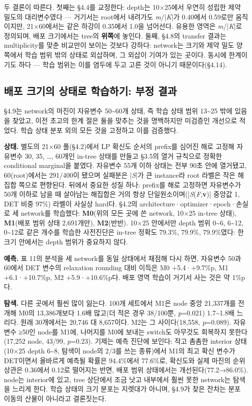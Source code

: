 \documentclass[final,5p,twocolumn]{elsarticle}
\begin{document}
두 결론이 따른다. 첫째는 §4.4를 교정한다: depth는 10×25에서 우연히 성립한 제약 밀도의 대리변수였다 — 거기서는 root에서 내려가도 \textit{m}/|\textit{K}|가 0.40에서 0.59로만 움직이지만, 21×60에서는 같은 하강이 0.35에서 1.0을 넘어선다. 유용한 영역은 \textit{m}/|\textit{K}|로 정의되며, 배포 크기에서는 tree의 \textbf{위쪽}에 놓인다. 둘째, §4.8의 transfer 결과는 multiplicity를 맞춘 비교만이 보이는 것보다 강하다: network는 크기와 제약 밀도 양쪽에서 학습 범위 밖의 상태로 외삽하며, 그 외삽이 기여가 있는 곳이다. 동시에 한계이기도 하다 — 학습 범위는 이를 염두에 두고 고른 것이 아니기 때문이다(§4.14).

\subsection{배포 크기의 상태로 학습하기: 부정 결과}
§4.9는 network의 마진이 자유변수 50\textasciitilde{}60개 상태, 즉 학습 상태 범위 13\textasciitilde{}25 밖에 있음을 찾았고, 이전 초고의 한계 절은 둘을 맞추는 것을 명백하지만 미검증인 개선으로 적었다. 학습 상태 분포 외의 모든 것을 고정하고 이를 검증했다.

\textbf{상태.} 별도의 21×60 풀(§4.2)에서 LP 확신도 순서의 prefix를 심어진 해로 고정해 자유변수 30, 35, …, 60개인 in-tree 상태를 만들고 §3.5의 열거 규칙으로 정확한 conditional marginal을 붙였다. 자유변수 55개 이하 상태는 전부 90초 안에 열거됐고, 60(root)에서는 291/400이 됐으며 실패분은 |\textit{S}|가 큰 instance라 root 라벨은 작은 해집합 쪽으로 편향된다. 뒤에서 중요한 성질 하나: prefix를 해로 고정하면 자유변수가 50개 이하로 남을 때 살아남는 해집합은 거의 항상 단일원소이며(|\textit{S}(\textit{F},\textbf{v})| 중앙값 1, DET 비중 97\%) 라벨이 사실상 hard다. §4.2의 architecture·optimizer·epoch·손실로 세 network를 학습했다: \textbf{M0}(위의 모든 곳에 쓴 network, 10×25 in-tree 상태), \textbf{M1}(배포 범위 상태 2,691개만), \textbf{M2}(반반). 10×25 안에서만 depth 범위 0\textasciitilde{}6, 6\textasciitilde{}12, 0\textasciitilde{}12로 같은 개수를 학습한 사전진단은 in-tree 정확도 79.3\%, 79.9\%, 79.9\%였다: 한 크기 안에서는 depth 범위가 중요하지 않다.

\textbf{예측.} 표 11의 분석을 세 network를 동일 상태에서 채점해 다시 하면, 자유변수 50과 60에서 DET 변수의 relaxation rounding 대비 이득은 M0 +5.4·+9.7\%p, M1 +6.1·+10.7\%p, M2 +5.9·+10.6\%p다. 배포 영역 학습이 거기서 사는 것은 약 1\%p다.

\textbf{탐색.} 다른 곳에서 훨씬 많이 잃는다. 100개 세트에서 M1은 node 중앙 21,337개를 전개해 M0의 13,386개보다 1.6배 많고(더 적은 경우 38/100뿐, \textit{p}=0.021) 1.7\textasciitilde{}1.8배 느리다. 원래 30개에서는 20,746 대 8,657이다. M2는 그 사이다(18,558, \textit{p}=0.089). 자유변수 ≥50인 node를 M1에, 나머지를 M0에 보내는 switch도 아무것도 회복하지 못한다(17,252 node, 43/99, \textit{p}=0.23). 기제는 예측 진단에 보인다: 작고 촘촘한 interior 상태(10×25 depth 6\textasciitilde{}8, 탐색이 node의 2/3를 쓰는 종류)에서 M1의 최고 확신 변수가 DET이면서 올바르게 예측될 확률은 94.4\%에서 77.6\%로, 확신도와 실제 마진의 순위 상관은 0.36에서 0.12로 떨어지는 반면, 배포 범위 상태에서는 개선된다(77.2→86.0\%). node는 interior에 있고, tree 상단에서 조금 낫고 내부에서 훨씬 못한 network는 탐색을 느리게 한다. 학습 상태의 크기 분포는 지렛대가 아니며, §4.9가 찾은 잔차는 분포 이동의 산물이 아니라고 결론짓는다.
\end{document}
